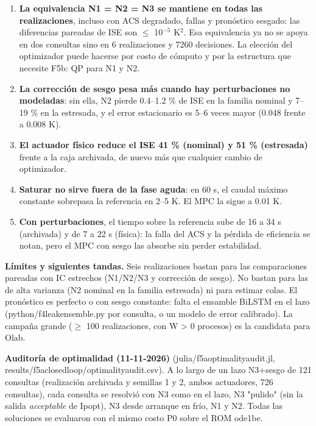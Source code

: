\documentclass[11pt,a4paper]{article}
\newcommand{\codeus}{\textunderscore\allowbreak}
\newcommand{\code}[1]{{\small\ttfamily\let\_\codeus #1}}
\begin{document}
\begin{enumerate}
\item \textbf{La equivalencia N1 = N2 = N3 se mantiene en todas las realizaciones}, incluso con ACS degradado, fallas y pronóstico sesgado: las diferencias pareadas de ISE son $\le$ 10$^{-5}$ K$^{2}$. Esa equivalencia ya no se apoya en dos consultas sino en 6 realizaciones y 7260 decisiones. La elección del optimizador puede hacerse por costo de cómputo y por la estructura que necesite F5b: QP para N1 y N2.
\item \textbf{La corrección de sesgo pesa más cuando hay perturbaciones no modeladas}: sin ella, N2 pierde 0.4–1.2 \% de ISE en la familia nominal y 7–19 \% en la estresada, y el error estacionario es 5–6 veces mayor (0.048 frente a 0.008 K).
\item \textbf{El actuador físico reduce el ISE 41 \% (nominal) y 51 \% (estresada)} frente a la caja archivada, de nuevo más que cualquier cambio de optimizador.
\item \textbf{Saturar no sirve fuera de la fase aguda}: en 60 s, el caudal máximo constante sobrepasa la referencia en 2–5 K. El MPC la sigue a 0.01 K.
\item \textbf{Con perturbaciones}, el tiempo sobre la referencia sube de 16 a 34 s (archivada) y de 7 a 22 s (física): la falla del ACS y la pérdida de eficiencia se notan, pero el MPC con sesgo las absorbe sin perder estabilidad.
\end{enumerate}

\textbf{Límites y siguientes tandas.} Seis realizaciones bastan para las comparaciones pareadas con IC estrechos (N1/N2/N3 y corrección de sesgo). No bastan para las de alta varianza (N2 nominal en la familia estresada) ni para estimar colas. El pronóstico es perfecto o con sesgo constante: falta el ensamble BiLSTM en el lazo (\code{python/f4\_leak\_ensemble.py} por consulta, o un modelo de error calibrado). La campaña grande ($\ge$ 100 realizaciones, con \code{W > 0} procesos) es la candidata para Olab.

\textbf{Auditoría de optimalidad (11-11-2026)} (\code{julia/f5a\_optimality\_audit.jl}, \code{results/f5a\_closed\_loop/optimality\_audit.csv}). A lo largo de un lazo N3+sesgo de 121 consultas (realización archivada y semillas 1 y 2, ambos actuadores, 726 consultas), cada consulta se resolvió con N3 como en el lazo, N3 "pulido" (sin la salida \emph{acceptable} de Ipopt), N3 desde arranque en frío, N1 y N2. Todas las soluciones se evaluaron con el mismo costo P0 sobre el ROM \code{ode1be}.
\end{document}
